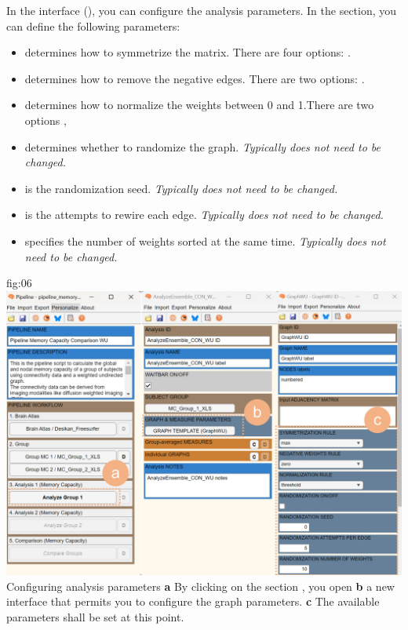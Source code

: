 \documentclass[justified]{tufte-handout}
\begin{document}
In the  interface (), you can configure the analysis parameters.
In the  section, you can define the following parameters:

\begin{itemize}
	
	\item {} determines how to symmetrize the matrix. There are four options: .
	
	\item {} determines how to remove the negative edges. There are two options: .
	
	\item {} determines how to normalize the weights between 0 and 1.There are two options ,
	
	\item {} determines whether to randomize the graph. \emph{Typically does not need to be changed.}
	
	\item {} is the randomization seed. \emph{Typically does not need to be changed.}
	
	\item {} is the attempts to rewire each edge. \emph{Typically does not need to be changed.}
	
	\item {} specifies the number of weights sorted at the same time. \emph{Typically does not need to be changed.}
	
\end{itemize}

{fig:06}
{
	\includegraphics{fig06.jpg}
}
{Configuring analysis parameters}
{
	{\bf a} By clicking on the section , you open {\bf b} a new interface that permits you to configure the graph parameters. {\bf c} The available parameters shall be set at this point.
}
\end{document}

